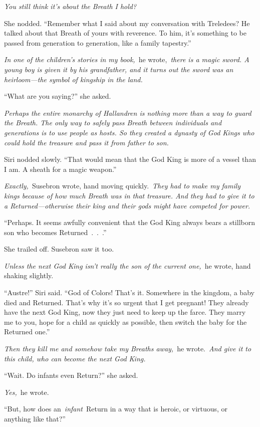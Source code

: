 \textit{You still think it’s about the Breath I hold?}

She nodded. “Remember what I said about my conversation with Treledees? He talked about that Breath of yours with reverence. To him, it’s something to be passed from generation to generation, like a family tapestry.”

\textit{In one of the children’s stories in my book,}~he wrote,~\textit{there is a magic sword. A young boy is given it by his grandfather, and it turns out the sword was an heirloom—the symbol of kingship in the land.}

“What are you saying?” she asked.

\textit{Perhaps the entire monarchy of Hallandren is nothing more than a way to guard the Breath. The only way to safely pass Breath between individuals and generations is to use people as hosts. So they created a dynasty of God Kings who could hold the treasure and pass it from father to son.}

Siri nodded slowly. “That would mean that the God King is more of a vessel than I am. A sheath for a magic weapon.”

\textit{Exactly,}~Susebron wrote, hand moving quickly.~\textit{They had to make my family kings because of how much Breath was in that treasure. And they had to give it to a Returned—otherwise their king and their gods might have competed for power.}

“Perhaps. It seems awfully convenient that the God King always bears a stillborn son who becomes Returned~.~.~.”

She trailed off. Susebron saw it too.

\textit{Unless the next God King isn’t really the son of the current one,}~he wrote, hand shaking slightly.

“Austre!” Siri said. “God of Colors! That’s it. Somewhere in the kingdom, a baby died and Returned. That’s why it’s so urgent that I get pregnant! They already have the next God King, now they just need to keep up the farce. They marry me to you, hope for a child as quickly as possible, then switch the baby for the Returned one.”

\textit{Then they kill me and somehow take my Breaths away,}~he wrote.~\textit{And give it to this child, who can become the next God King.}

“Wait. Do infants even Return?” she asked.

\textit{Yes,}~he wrote.

“But, how does an~\textit{infant}~Return in a way that is heroic, or virtuous, or anything like that?”

